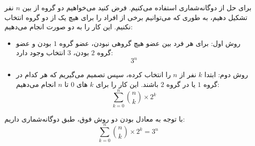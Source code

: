 \p
برای حل از دوگانه‌شماری استفاده می‌کنیم. 
 فرض کنید می‌خواهیم دو گروه از بین
$n$
نفر تشکیل دهیم، به طوری که می‌توانیم برخی از افراد را برای هیچ یک از دو گروه انتخاب نکنیم. 
این کار را به دو صورت انجام می‌دهیم:

\begin{itemize}
\item
روش اول:
       برای هر فرد بین عضو هیچ گروهی نبودن، عضو گروه 
$1$ 
        بودن و عضو گروه 
$2$ 
        بودن،
$3$ 
        انتخاب وجود دارد:
        $$3^n$$

\item     
روش دوم:
        ابتدا
$k$
         نفر از
$n$
          را انتخاب کرده، سپس تصمیم می‌گیریم که هر کدام در گروه 
$1$
         یا در گروه
$2$ 
    باشند. این کار را برای
$k$
         ‌های 
$0$ 
          تا
$n$ 
         انجام می‌دهیم:
        $$\sum_{k=0}^{n} {\binom{n}{k}\times2^k}$$

\end{itemize}
    با توجه به معادل بودن دو روش فوق، طبق دوگانه‌شماری داریم:
    $$\sum_{k=0}^{n} {\binom{n}{k}\times2^k} = 3^n$$